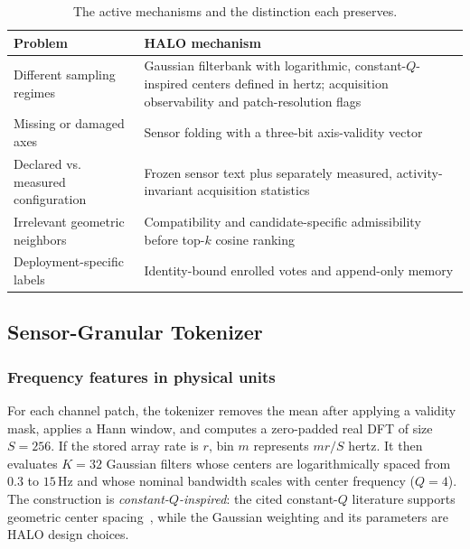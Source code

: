 \begin{table}[t]
  \centering
  \caption{The active mechanisms and the distinction each preserves.}
  \label{tab:mechanisms}
  \scriptsize
  \setlength{\tabcolsep}{3pt}
  \begin{tabular}{@{}p{}p{}@{}}
    \toprule
    Problem & HALO mechanism \\
    \midrule
    Different sampling regimes & Gaussian filterbank with logarithmic, constant-$Q$-inspired
      centers defined in hertz; acquisition observability and patch-resolution flags \\[2pt]
    Missing or damaged axes & Sensor folding with a three-bit axis-validity vector \\[2pt]
    Declared vs. measured configuration & Frozen sensor text plus separately measured,
      activity-invariant acquisition statistics \\[2pt]
    Irrelevant geometric neighbors & Compatibility and candidate-specific admissibility before
      top-$k$ cosine ranking \\[2pt]
    Deployment-specific labels & Identity-bound enrolled votes and append-only memory \\
    \bottomrule
  \end{tabular}
\end{table}

\subsection{Sensor-Granular Tokenizer}
\label{sec:tokenizer_design}

\subsubsection{Frequency features in physical units}
\label{sec:filterbank}

For each channel patch, the tokenizer removes the mean after applying a validity mask, applies a
Hann window, and computes a zero-padded real DFT of size $S{=}256$. If the stored array rate is $r$,
bin $m$ represents $mr/S$ hertz. It then evaluates $K{=}32$ Gaussian filters whose centers are
logarithmically spaced from $0.3$ to $15$\,Hz and whose nominal bandwidth scales with center
frequency ($Q{=}4$). The construction is \emph{constant-$Q$-inspired}: the cited constant-$Q$
literature supports geometric center spacing~\cite{constantq,constantqfast}, while the Gaussian
weighting and its parameters are HALO design choices.

